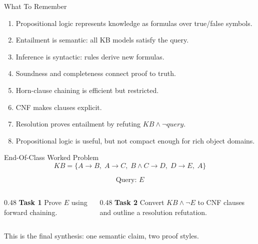 \documentclass[aspectratio=169,11pt]{beamer}
\newcommand{\minihead}[1]{\textbf{\color{unswblue}#1}}
\begin{document}
\begin{frame}{What To Remember}
  \begin{enumerate}
    \item Propositional logic represents knowledge as formulas over true/false symbols.
    \item Entailment is semantic: all KB models satisfy the query.
    \item Inference is syntactic: rules derive new formulas.
    \item Soundness and completeness connect proof to truth.
    \item Horn-clause chaining is efficient but restricted.
    \item CNF makes clauses explicit.
    \item Resolution proves entailment by refuting $KB \land \neg query$.
    \item Propositional logic is useful, but not compact enough for rich object domains.
  \end{enumerate}
\end{frame}

\begin{frame}{End-Of-Class Worked Problem}
  \small
  \[
  KB =
  \{
    A \rightarrow B,\;
    A \rightarrow C,\;
    B \land C \rightarrow D,\;
    D \rightarrow E,\;
    A
  \}
  \]

  \[
    \text{Query: } E
  \]

  \begin{columns}[T,onlytextwidth]
    \begin{column}{0.48\textwidth}
      \minihead{Task 1}
      Prove $E$ using forward chaining.
    \end{column}
    \begin{column}{0.48\textwidth}
      \minihead{Task 2}
      Convert $KB \land \neg E$ to CNF clauses and outline a resolution refutation.
    \end{column}
  \end{columns}

  \vspace{0.8em}
  This is the final synthesis: one semantic claim, two proof styles.
\end{frame}
\end{document}
